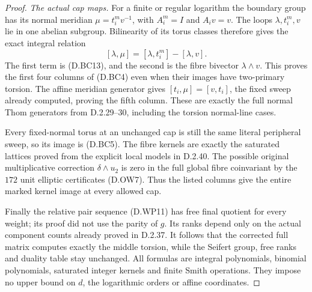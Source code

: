 \begin{proof}
\emph{The actual cap maps.}
For a finite or regular logarithm the boundary
group has its normal meridian
$\mu=t_i^m v^{-1}$, with $A_i^m=I$ and
$A_i v=v$. The loops $\lambda,t_i^m,v$ lie
in one abelian subgroup. Bilinearity of its
torus classes therefore gives the exact
integral relation
\[
              [\lambda,\mu]=[\lambda,t_i^m]-[\lambda,v].
                                                        \tag{D.BC15}
\]
The first term is (D.BC13), and the second is
the fibre bivector $\lambda\wedge v$.
This proves the first four columns of (D.BC4)
even when their images have two-primary
torsion. The affine meridian generator gives
$[t_i,\mu]=[v,t_i]$, the fixed sweep already
computed, proving the fifth column. These
are exactly the full normal Thom generators
from D.2.29--30, including the torsion
normal-line cases.

Every fixed-normal torus at an unchanged cap
is still the same literal peripheral sweep,
so its image is (D.BC5). The fibre kernels
are exactly the saturated lattices proved
from the explicit local models in D.2.40.
The possible original multiplicative
correction $\delta\wedge u_2$ is zero in
the full global fibre coinvariant by the
$172$ unit elliptic certificates (D.OW7).
Thus the listed columns give the entire
marked kernel image at every allowed cap.

Finally the relative pair sequence (D.WP11)
has free final quotient for every weight;
its proof did not use the parity of $g$.
Its ranks depend only on the actual component
counts already proved in D.2.37. It follows
that the corrected full matrix computes
exactly the middle torsion, while the Seifert
group, free ranks and duality table stay
unchanged. All formulas are integral
polynomials, binomial polynomials, saturated
integer kernels and finite Smith operations.
They impose no upper bound on $d$, the
logarithmic orders or affine coordinates.
\end{proof}
